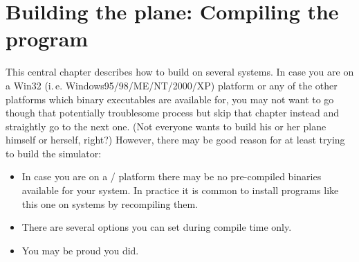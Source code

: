 
\chapter{Building the plane: Compiling the program\label{building}}

This central chapter describes how to build \FlightGear{} on several systems. In case you
are on a Win32 (i.\,e. Windows95/98/ME/NT/2000/XP) platform or any of the other platforms
which binary executables are available for, you may not want to go though that
potentially troublesome process but skip that chapter instead and straightly go to the
next one. (Not everyone wants to build his or her plane himself or herself, right?)
However, there may be good reason for at least trying to build the simulator:

\begin{itemize}
\item In case you are on a / platform there may be no
pre-compiled binaries available for your system. In
practice it is common to install programs like this one on  systems by
recompiling them.

\item There are several options you can set during compile time only.

\item You may be proud you did.
\end{itemize}

